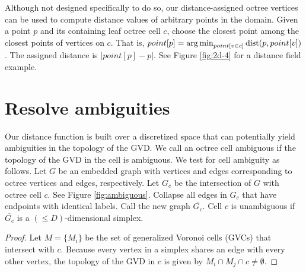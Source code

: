 \documentclass{egpubl}
\begin{document}
Although not designed specifically to do so, our distance-assigned octree vertices can be used to compute distance values of arbitrary points in the domain.  Given a point $p$ and its containing leaf octree cell $c$, choose the closest point among the closest points of vertices on $c$.  That is, $point[p] = \operatorname*{arg\,min}_{point[v \in c]} \text{dist}(p, point[v])$. The assigned distance is $|point[p]-p|$.  See Figure \ref{fig:2d-4} for a distance field example.

\section{Resolve ambiguities}

\newcommand{\vlabel}{\mathscr{L}}


Our distance function is built over a discretized space that can potentially yield ambiguities in the topology of the GVD.  We call an octree cell ambiguous if the topology of the GVD in the cell is ambiguous.  We test for cell ambiguity as follows. Let $G$ be an embedded graph with vertices and edges corresponding to octree vertices and edges, respectively.  Let $G_c$ be the intersection of $G$ with octree cell $c$. See Figure \ref{fig:ambiguous}. Collapse all edges in $G_c$ that have endpoints with identical labels.  Call the new graph $\overline{G_c}$. Cell $c$ is unambiguous if $\overline{G_c}$ is a $(\le D)$-dimensional simplex.
\begin{proof}
Let $M=\{M_i\}$ be the set of generalized Voronoi cells (GVCs) that intersect with $c$.  Because every vertex in a simplex shares an edge with every other vertex, the topology of the GVD in $c$ is given by $M_i \cap M_j \cap c \ne \emptyset$.
\end{proof}
\end{document}
